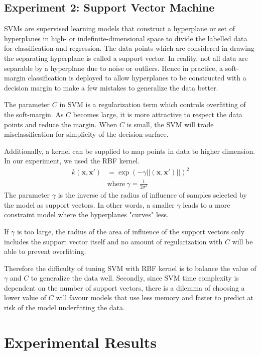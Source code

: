 \documentclass[letterpaper]{article}
\begin{document}
\subsection{Experiment 2: Support Vector Machine}
SVMs are supervised learning models that construct a hyperplane or set of hyperplanes in high-
or indefinite-dimensional space to divide the labelled data for classification and regression.
The data points which are considered in drawing the separating hyperplane is called a support
vector. In reality, not all data are separable by a hyperplane due to noise or outliers. Hence in
practice, a soft-margin classification is deployed to allow hyperplanes to be constructed
with a decision margin to make a few mistakes to generalize the data better.

The parameter $\textit{C}$ in SVM is a regularization term which controls overfitting of the soft-margin.
As $\textit{C}$ becomes large, it is more attractive to respect the data points and reduce
the margin. When $\textit{C}$ is small, the SVM will trade misclassification for simplicity
of the decision surface.

Additionally, a kernel can be supplied to map points in data to higher dimension. In our
experiment, we used the RBF kernel.
\begin{align*}
k (\textbf{x},\textbf{x}') &= \exp(-\gamma||(\textbf{x},\textbf{x}')||)^2 \\
&\text{where} \ \gamma = \frac{1}{2\sigma^2}
\end{align*}
The parameter $\gamma$ is the inverse of the radius of influence of samples selected by the
model as support vectors. In other words, a smaller $\gamma$ leads to a more constraint
model where the hyperplanes "curves" less.

If $\gamma$ is too large, the radius of the area of influence of the support vectors only
includes the support vector itself and no amount of regularization with $\textit{C}$ will be
able to prevent overfitting.

Therefore the difficulty of tuning SVM with RBF kernel is to balance the value of
$\gamma$ and $\textit{C}$ to generalize the data well. Secondly, since SVM time complexity
is dependent on the number of support vectors, there is a dilemma of choosing a lower value
of $\textit{C}$ will favour models that use less memory and faster to predict at risk of
the model underfitting the data.
\vfill\eject
\section{Experimental Results}
\end{document}
